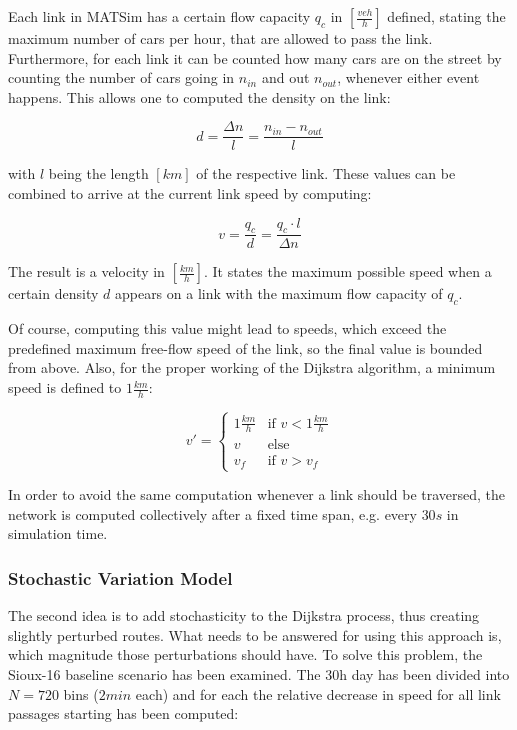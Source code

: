 Each link in MATSim has a certain flow capacity $q_c$ in $\left[\frac{veh}{h}\right]$ defined, stating the maximum number
of cars per hour, that are allowed to pass the link.
Furthermore, for each link it can be counted how many cars are on the street by
counting the number of cars going in $n_{in}$ and out $n_{out}$, whenever either
event happens. This allows one to computed the density on the link:

\begin{equation}
d = \frac{\Delta n}{l} = \frac{n_{in} - n_{out}}{l}
\end{equation}

with $l$ being the length $[km]$ of the respective link. These values can be combined
to arrive at the current link speed by computing:

\begin{equation}
v = \frac{q_c}{d} = \frac{q_c \cdot l}{\Delta n}
\end{equation}

The result is a velocity in $\left[ \frac{km}{h} \right]$.
It states the maximum possible speed when a certain density $d$ appears on
a link with the maximum flow capacity of $q_c$.

Of course, computing this value might lead to speeds, which exceed the predefined
maximum free-flow speed of the link, so the final value is bounded from above. Also,
for the proper working of the Dijkstra algorithm, a minimum speed is defined to
$1 \frac{km}{h}$:

\begin{equation}
v' = \begin{cases}
1 \frac{km}{h} & \text{if } v < 1 \frac{km}{h} \\
v & \text{else } \\
v_f & \text{if } v > v_f
\end{cases}
\end{equation}

In order to avoid the same computation whenever a link should be traversed, the
network is computed collectively after a fixed time span, e.g. every $30s$ in
simulation time.

\subsubsection{Stochastic Variation Model}
\label{sec:routing_variation}

The second idea is to add stochasticity to the Dijkstra process, thus creating
slightly perturbed routes. What needs to be answered for using this approach is,
which magnitude those perturbations should have. To solve this problem,
the Sioux-16 baseline scenario has been examined. The 30h day has been divided
into $N=720$ bins ($2min$ each) and for each the relative decrease in speed for
all link passages starting has been computed:

